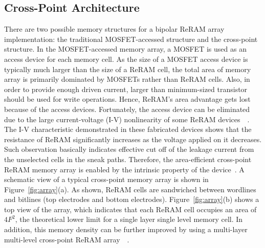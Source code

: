 \subsection{Cross-Point Architecture}
There are two possible memory structures for a bipolar ReRAM array
implementation: the traditional MOSFET-accessed structure and the
cross-point structure. In the MOSFET-accessed memory array, a MOSFET is
used as an access device for each memory cell. As the size of a MOSFET
access device is typically much larger than the size of a ReRAM cell, the
total area of memory array is primarily dominated by MOSFETs rather than
ReRAM cells. Also, in order to provide enough driven current, larger than
minimum-sized transistor should be used for write operations. Hence,
ReRAM's area advantage gets lost because of the access devices.
Fortunately, the access device can be eliminated due to the large
current-voltage (I-V) nonlinearity of some ReRAM
devices~~\cite{memristor:switch,memristor:Unity}. The I-V characteristic
demonstrated in these fabricated devices shows that the resistance of
ReRAM significantly increases as the voltage applied on it decreases. Such
observation basically indicates effective cut off of the leakage current
from the unselected cells in the sneak paths. Therefore, the
area-efficient cross-point ReRAM memory array is enabled by the intrinsic
property of the device~\cite{memristor:Cong}. A schematic view of a
typical cross-point memory array is shown in Figure~\ref{fig:array}(a). As
shown, ReRAM cells are sandwiched between wordlines and bitlines (top
electrodes and bottom electrodes). Figure~\ref{fig:array}(b) shows a top
view of the array, which indicates that each ReRAM cell occupies an area
of $4F^2$, the theoretical lower limit for a single layer single level
memory cell. In addition, this memory density can be further improved by
using a multi-layer multi-level cross-point ReRAM
array~\cite{crossbar_unity}~\cite{memristor:IEDM08_3D}.

